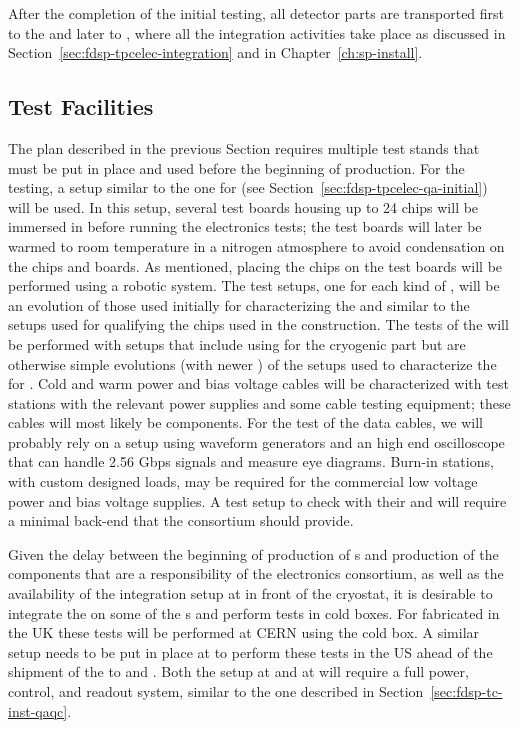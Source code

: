 After the completion of the initial  testing, all detector 
parts are transported first to the  and later to , 
where all the integration activities take place as discussed in
Section~\ref{sec:fdsp-tpcelec-integration} and in Chapter~\ref{ch:sp-install}.

\subsection{Test Facilities}
\label{sec:fdsp-tpcelec-production-facilities}

The  plan described in the previous Section requires
multiple test stands that must be put in place and used 
before the beginning of production. For the 
testing, a setup similar to the one for  (see
Section~\ref{sec:fdsp-tpcelec-qa-initial}) will
be used. In this setup, several test boards housing up to 24
chips will be immersed in \lntwo before running the
electronics tests; the test boards will later be warmed to room temperature in 
a nitrogen atmosphere to avoid condensation on the chips and
boards. As mentioned, placing the chips on the test 
boards will be performed using a robotic system. The test setups,
one for each kind of , will be an evolution of those
used initially for characterizing the  and similar
to the setups used for qualifying the chips used in the 
construction. The tests of the  will be performed with
setups that include using  for the cryogenic part
but are otherwise simple evolutions (with newer )
of the setups used to characterize the 
for . Cold and warm power and bias voltage cables will
be characterized with test stations with the relevant 
power supplies and some cable testing equipment; these cables will most
likely be  components.
For the test of the data cables, we will probably rely on a setup
using waveform generators and an high end oscilloscope that 
can handle 2.56 Gbps signals and measure eye diagrams. 
Burn-in stations, with custom designed loads, may be required for 
the commercial low voltage power and bias voltage supplies.
A test setup to check  with their 
and  will require a minimal  back-end that the
 consortium should provide.

Given the delay between the beginning of production of 
s and production of the components that are a responsibility of
the  electronics consortium, as well as the availability of the
integration setup at  in front of the cryostat, it is
desirable to integrate the  on some of the s 
and perform tests in cold boxes. For  fabricated in the UK
these tests will be performed at CERN using the  cold box.
A similar setup needs to be put in place at  to perform 
these tests in the US ahead of the shipment of the  to 
 and . Both the setup at  and
at  will require a full power, control, and readout system, similar
to the one described in Section~\ref{sec:fdsp-tc-inst-qaqc}.
